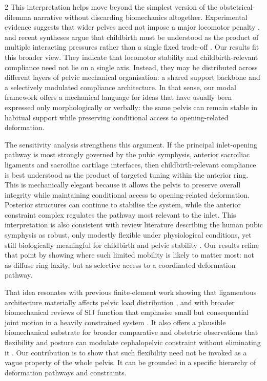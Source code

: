 \documentclass[openacc]{rsproca_new}
\begin{document}
\begin{multicols}{2}
This interpretation helps move beyond the simplest version of the obstetrical-dilemma narrative without discarding biomechanics altogether. Experimental evidence suggests that wider pelves need not impose a major locomotor penalty \cite{Warrener2015}, and recent syntheses argue that childbirth must be understood as the product of multiple interacting pressures rather than a single fixed trade-off \cite{Pavlicev2020,Haeusler2021,Grunstra2023}. Our results fit this broader view. They indicate that locomotor stability and childbirth-relevant compliance need not lie on a single axis. Instead, they may be distributed across different layers of pelvic mechanical organisation: a shared support backbone and a selectively modulated compliance architecture. In that sense, our modal framework offers a mechanical language for ideas that have usually been expressed only morphologically or verbally: the same pelvis can remain stable in habitual support while preserving conditional access to opening-related deformation.

The sensitivity analysis strengthens this argument. If the principal inlet-opening pathway is most strongly governed by the pubic symphysis, anterior sacroiliac ligaments and sacroiliac cartilage interfaces, then childbirth-relevant compliance is best understood as the product of targeted tuning within the anterior ring. This is mechanically elegant because it allows the pelvis to preserve overall integrity while maintaining conditional access to opening-related deformation. Posterior structures can continue to stabilise the system, while the anterior constraint complex regulates the pathway most relevant to the inlet. This interpretation is also consistent with review literature describing the human pubic symphysis as robust, only modestly flexible under physiological conditions, yet still biologically meaningful for childbirth and pelvic stability \cite{Grunstra2019,Stolarczyk2021}. Our results refine that point by showing where such limited mobility is likely to matter most: not as diffuse ring laxity, but as selective access to a coordinated deformation pathway.

That idea resonates with previous finite-element work showing that ligamentous architecture materially affects pelvic load distribution \cite{Eichenseer2011,Hammer2013}, and with broader biomechanical reviews of SIJ function that emphasise small but consequential joint motion in a heavily constrained system \cite{Vleeming2012,Kiapour2019,ChoKwak2020}. It also offers a plausible biomechanical substrate for broader comparative and obstetric observations that flexibility and posture can modulate cephalopelvic constraint without eliminating it \cite{Pink2024,Fremondiere2022}. Our contribution is to show that such flexibility need not be invoked as a vague property of the whole pelvis. It can be grounded in a specific hierarchy of deformation pathways and constraints.


\end{multicols}
\end{document}
